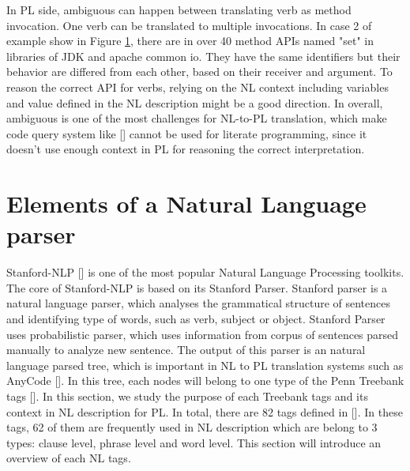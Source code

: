In PL side, ambiguous can happen between translating verb as method invocation. One verb can be translated to multiple invocations. In case 2 of example show in Figure \ref{}, there are in over 40 method APIs named "set" in libraries of JDK and apache common io. They have the same identifiers but their behavior are differed from each other, based on their receiver and argument. To reason the correct API for verbs, relying on the NL context including variables and value defined in the NL description might be a good direction. In overall, ambiguous is one of the most challenges for NL-to-PL translation, which make code query system like [\cite{Gvero:2015:SJE:2814270.2814295}] cannot be used for literate programming, since it doesn't use enough context in PL for reasoning the correct interpretation. 
     
\section{Elements  of a Natural Language parser}

Stanford-NLP [\cite{P13-1045}] is one of the most popular Natural Language Processing toolkits. The core of Stanford-NLP is based on its Stanford Parser. Stanford parser is a natural language parser, which analyses the grammatical structure of sentences and identifying type of words, such as verb, subject or object. Stanford Parser uses probabilistic parser, which uses information from corpus of sentences parsed manually to analyze new sentence. The output of this parser is an natural language parsed tree, which is important in NL to PL translation systems such as AnyCode [\cite{Gvero:2015:SJE:2814270.2814295}]. In this tree, each nodes will belong to one type of the Penn Treebank tags [\cite{Taylor2003}]. In this section, we study the purpose of each Treebank tags and its context in NL description for PL. In total, there are 82 tags defined in [\cite{Taylor2003}]. In these tags, 62 of them are frequently used in  NL description which are belong to 3 types: clause level, phrase level and word level. This section will introduce an overview of each NL tags.

